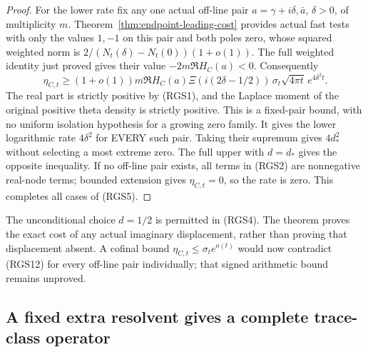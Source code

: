\documentclass[11pt]{article}
\theoremstyle{remark}\newtheorem{remark}[theorem]{Remark}
\begin{document}
\begin{proof}
For the lower rate fix any one actual off-line pair
$a=\gamma+i\delta,\bar a$, $\delta>0$, of multiplicity $m$.
Theorem~\ref{thm:endpoint-leading-cost} provides actual fast
tests with only the values $1,-1$ on this pair and both
poles zero, whose squared weighted norm is
$2/(N_t(\delta)-N_t(0))(1+o(1))$.
The full weighted identity just proved gives their value
$-2m\Re H_C(a)<0$. Consequently
\[
 \eta_{C,t}\ge (1+o(1))m\Re H_C(a)
       \Xi(i(2\delta-1/2))\,
               \sigma_t\sqrt{4\pi t}\,e^{4\delta^2t}.
                                                        \tag{RGS12}
\]
The real part is strictly positive by (RGS1), and the
Laplace moment of the original positive theta density is
strictly positive. This is a fixed-pair bound, with no
uniform isolation hypothesis for a growing zero family.
It gives the lower logarithmic rate $4\delta^2$ for EVERY
such pair. Taking their supremum gives $4d_*^2$ without
selecting a most extreme zero. The full upper with $d=d_*$
gives the opposite inequality. If no off-line pair exists,
all terms in (RGS2) are nonnegative real-node terms;
bounded extension gives $\eta_{C,t}=0$, so the rate is zero.
This completes all cases of (RGS5).
\end{proof}

The unconditional choice $d=1/2$ is permitted in (RGS4).
The theorem proves the exact cost of any actual imaginary
displacement, rather than proving that displacement absent.
A cofinal bound $\eta_{C,t}\le\sigma_t e^{o(t)}$ would now
contradict (RGS12) for every off-line pair individually;
that signed arithmetic bound remains unproved.

\subsection{A fixed extra resolvent gives a complete trace-class operator}
\label{sec:smoothed-rest-trace}
\end{document}
